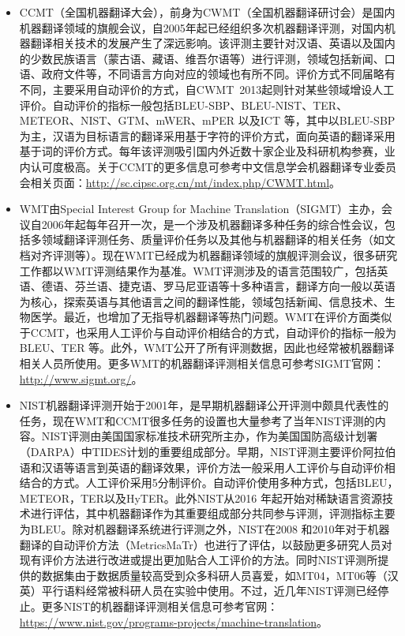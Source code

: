 \begin{appendices}
\begin{itemize}
\vspace{0.5em}
\item CCMT（全国机器翻译大会），前身为CWMT（全国机器翻译研讨会）是国内机器翻译领域的旗舰会议，自2005年起已经组织多次机器翻译评测，对国内机器翻译相关技术的发展产生了深远影响。该评测主要针对汉语、英语以及国内的少数民族语言（蒙古语、藏语、维吾尔语等）进行评测，领域包括新闻、口语、政府文件等，不同语言方向对应的领域也有所不同。评价方式不同届略有不同，主要采用自动评价的方式，自CWMT\ 2013起则针对某些领域增设人工评价。自动评价的指标一般包括BLEU-SBP、BLEU-NIST、TER、METEOR、NIST、GTM、mWER、mPER 以及ICT 等，其中以BLEU-SBP 为主，汉语为目标语言的翻译采用基于字符的评价方式，面向英语的翻译采用基于词的评价方式。每年该评测吸引国内外近数十家企业及科研机构参赛，业内认可度极高。关于CCMT的更多信息可参考中文信息学会机器翻译专业委员会相关页面：\url{http://sc.cipsc.org.cn/mt/index.php/CWMT.html}。
\vspace{0.5em}
\item WMT由Special Interest Group for Machine Translation（SIGMT）主办，会议自2006年起每年召开一次，是一个涉及机器翻译多种任务的综合性会议，包括多领域翻译评测任务、质量评价任务以及其他与机器翻译的相关任务（如文档对齐评测等）。现在WMT已经成为机器翻译领域的旗舰评测会议，很多研究工作都以WMT评测结果作为基准。WMT评测涉及的语言范围较广，包括英语、德语、芬兰语、捷克语、罗马尼亚语等十多种语言，翻译方向一般以英语为核心，探索英语与其他语言之间的翻译性能，领域包括新闻、信息技术、生物医学。最近，也增加了无指导机器翻译等热门问题。WMT在评价方面类似于CCMT，也采用人工评价与自动评价相结合的方式，自动评价的指标一般为BLEU、TER 等。此外，WMT公开了所有评测数据，因此也经常被机器翻译相关人员所使用。更多WMT的机器翻译评测相关信息可参考SIGMT官网：\url{http://www.sigmt.org/}。
\vspace{0.5em}
\item NIST机器翻译评测开始于2001年，是早期机器翻译公开评测中颇具代表性的任务，现在WMT和CCMT很多任务的设置也大量参考了当年NIST评测的内容。NIST评测由美国国家标准技术研究所主办，作为美国国防高级计划署（DARPA）中TIDES计划的重要组成部分。早期，NIST评测主要评价阿拉伯语和汉语等语言到英语的翻译效果，评价方法一般采用人工评价与自动评价相结合的方式。人工评价采用5分制评价。自动评价使用多种方式，包括BLEU，METEOR，TER以及HyTER。此外NIST从2016 年起开始对稀缺语言资源技术进行评估，其中机器翻译作为其重要组成部分共同参与评测，评测指标主要为BLEU。除对机器翻译系统进行评测之外，NIST在2008 和2010年对于机器翻译的自动评价方法（MetricsMaTr）也进行了评估，以鼓励更多研究人员对现有评价方法进行改进或提出更加贴合人工评价的方法。同时NIST评测所提供的数据集由于数据质量较高受到众多科研人员喜爱，如MT04，MT06等（汉英）平行语料经常被科研人员在实验中使用。不过，近几年NIST评测已经停止。更多NIST的机器翻译评测相关信息可参考官网：\url{https://www.nist.gov/programs-projects/machine-translation}。

\end{itemize}
\end{appendices}
